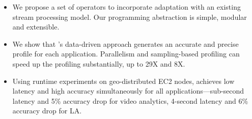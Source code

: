 \begin{itemize}[leftmargin=16pt]

\item We propose a set of \maybe{} operators to incorporate adaptation with
  an existing stream processing model. Our programming abstraction is simple,
  modular and extensible.

\item We show that \sysname{}'s data-driven approach generates an accurate and
  precise profile for each application. Parallelism and sampling-based profiling
  can speed up the profiling substantially, up to 29X and 8X\@.

\item Using runtime experiments on geo-distributed EC2 nodes, \sysname{}
  achieves low latency and high accuracy simultaneously for all applications---sub-second latency and 5\% accuracy drop for video analytics, 4-second latency
  and 6\% accuracy drop for LA\@.

\end{itemize}


